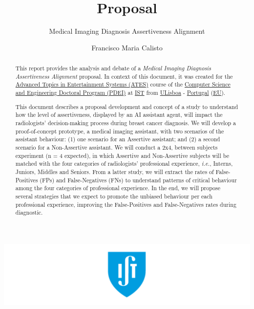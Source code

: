 \documentclass[sigchi]{acmart}
\begin{document}
\title{Proposal}
\subtitle{Medical Imaging Diagnosis Assertiveness Alignment}

\author{Francisco Maria Calisto}

\renewcommand{\shortauthors}{Calisto}


\begin{abstract}

This report provides the analysis and debate of a \textit{Medical Imaging Diagnosis Assertiveness Alignment} proposal.
In context of this document, it was created for the \hyperlink{https://fenix.tecnico.ulisboa.pt/disciplinas/TASE4/2019-2020/2-semestre}{Advanced Topics in Entertainment Systems (ATES)} course of the \hyperlink{https://fenix.tecnico.ulisboa.pt/cursos/deic/curriculo}{Computer Science and Engineering Doctoral Program (PDEI)} at \hyperlink{https://tecnico.ulisboa.pt/en/}{IST} from \hyperlink{https://www.ulisboa.pt/}{ULisboa} - \hyperlink{https://www.portugal.gov.pt/en/}{Portugal} (\hyperlink{https://europa.eu}{EU}).

This document describes a proposal development and concept of a study to understand how the level of assertiveness, displayed by an AI assistant agent, will impact the radiologists' decision-making process during breast cancer diagnosis.
We will develop a proof-of-concept prototype, a medical imaging assistant, with two scenarios of the assistant behaviour:
(1) one scenario for an Assertive assistant; and
(2) a second scenario for a Non-Assertive assistant.
We will conduct a 2x4, between subjects experiment (n = 4 expected), in which Assertive and Non-Assertive subjects will be matched with the four categories of radiologists' professional experience, {\it i.e.}, Interns, Juniors, Middles and Seniors.
From a latter study, we will extract the rates of False-Positives (FPs) and False-Negatives (FNs) to understand patterns of critical behaviour among the four categories of professional experience.
In the end, we will propose several strategies that we expect to promote the unbiased behaviour per each professional experience, improving the False-Positives and False-Negatives rates during diagnostic.

\end{abstract}

\begin{teaserfigure}
\includegraphics[width=\textwidth]{teaser}
\end{teaserfigure}


\maketitle



\break



\end{document}
